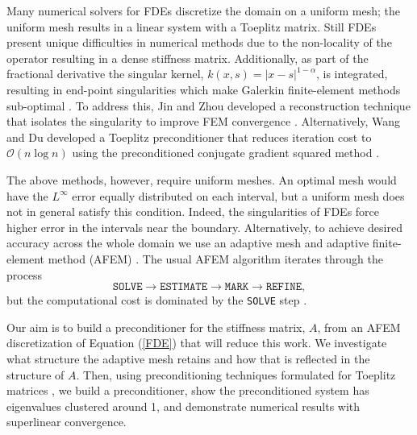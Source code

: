 \documentclass[review]{siamart251216}
\newcommand{\bigOh}{\mathcal{O}}
\newcommand{\A}{{A }}
\begin{document}
Many numerical solvers for FDEs discretize the domain on a uniform mesh; the uniform mesh results in a linear system with a Toeplitz matrix. Still FDEs present unique difficulties in numerical methods due to the non-locality of the operator resulting in a dense stiffness matrix. Additionally, as part of the fractional derivative the singular kernel, $k(x,s) = |x-s|^{1-\alpha}$, is integrated, resulting in end-point singularities which make Galerkin finite-element methods sub-optimal \cite{hierarch,superfast}. To address this, Jin and Zhou developed a reconstruction technique that isolates the singularity to improve FEM convergence \cite{JZ}. Alternatively, Wang and Du developed a Toeplitz preconditioner that reduces iteration cost to $\bigOh(n \log n)$ using the preconditioned conjugate gradient squared method \cite{superfast}. 

The above methods, however, require uniform meshes. An optimal mesh would have the $L^{\infty}$ error equally distributed on each interval, but a uniform mesh does not in general satisfy this condition. Indeed, the singularities of FDEs force higher error in the intervals near the boundary. Alternatively, to achieve desired accuracy across the whole domain we use an adaptive mesh and adaptive finite-element method (AFEM) \cite{AFEM, Xiaozhe}. The usual AFEM algorithm iterates through the process 
\begin{equation} \label{AFEM}
	\texttt{SOLVE} \rightarrow \texttt{ESTIMATE} \rightarrow \texttt{MARK} \rightarrow \texttt{REFINE},
\end{equation} 
but the computational cost is dominated by the \texttt{SOLVE} step \cite{Xiaozhe}. 

Our aim is to build a preconditioner for the stiffness matrix, $\A$, from an AFEM discretization of Equation (\ref{FDE}) that will reduce this work. We investigate what structure the adaptive mesh retains and how that is reflected in the structure of $\A$. Then, using preconditioning techniques formulated for Toeplitz matrices \cite{Chan_Strang, Chan_Yeung, precond_review, schrod}, we build a preconditioner, show the preconditioned system has eigenvalues clustered around 1, and demonstrate numerical results with superlinear convergence. 
\end{document}
